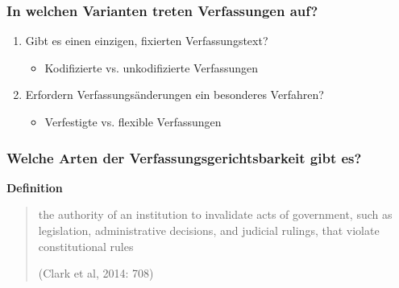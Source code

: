 \documentclass{beamer}
\begin{document}
\begin{frame}
  \frametitle{In welchen Varianten treten Verfassungen auf?}
  \begin{enumerate}
    \item Gibt es einen einzigen, fixierten Verfassungstext?
    \begin{itemize}
      \item Kodifizierte vs. unkodifizierte Verfassungen
    \end{itemize}
    \item Erfordern Verfassungsänderungen ein besonderes Verfahren?
    \begin{itemize}
      \item Verfestigte vs. flexible Verfassungen
    \end{itemize}
  \end{enumerate}

  \begin{table}
    \centering
    \caption*{\textbf{Idealtypische Verfassungen}}
  \end{table}
\end{frame}

\begin{frame}
\frametitle{Welche Arten der Verfassungsgerichtsbarkeit gibt es?}

\textbf{Definition}

\begin{quote}
the authority of an institution to invalidate acts of
govern\-ment, such as legislation, administrative decisions,
and judicial rulings, that violate constitutional rules

\textnormal{(Clark et al, 2014: 708)}
\end{quote}
  \begin{table}
    \centering
    \caption*{\textbf{Idealtypische Formen der Verfassungsgerichtsbarkeit}}
  \end{table}
\end{frame}
\end{document}
